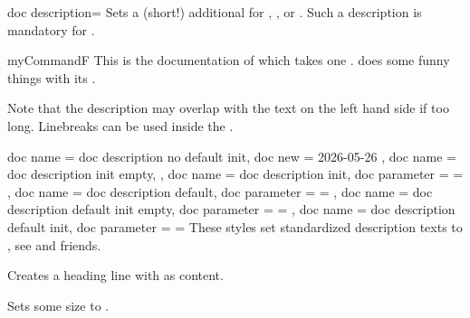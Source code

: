 \clearpage

\begin{docTcbKey}{doc description}{=}{\tcbdocdescInitEmpty}
  Sets a (short!) additional  for
  , , or .
  Such a description is
  mandatory for .
\begin{dispExample}
\begin{docCommand*}[doc description=my description]{myCommandF}{}
  This is the documentation of  which takes one .
   does some funny things with its .
\end{docCommand*}
\end{dispExample}
\begin{marker}
Note that the description  may overlap with the text on the left
hand side if too long. Linebreaks can be used inside the .
\end{marker}
\end{docTcbKey}

\begin{docTcbKeys}[doc description = style]
  {
    {
      doc name = doc description no default init,
      doc new  = 2026-05-26
    },
    {
      doc name = doc description init empty,
    },
    {
      doc name = doc description init,
      doc parameter = {=}
    },
    {
      doc name = doc description default,
      doc parameter = {=}
    },
    {
      doc name = doc description default init empty,
      doc parameter = {=}
    },
    {
      doc name = doc description default init,
      doc parameter = {=}
    }
  }
These styles set standardized description texts to
, see  and friends.

\begin{dispExample}
\begin{docKeys}[
    doc name              = /foo/footitle,
    doc parameter eq meta = text,
    doc description init empty
  ]{}
  Creates a heading line with  as content.
\end{docKeys}

\begin{docKeys}[
    doc name                     = /foo/foosize,
    doc parameter eq meta*       = length,
    doc description default init = {10cm}{3cm}
  ]{}
  Sets some size to .
\end{docKeys}
\end{dispExample}
\end{docTcbKeys}


